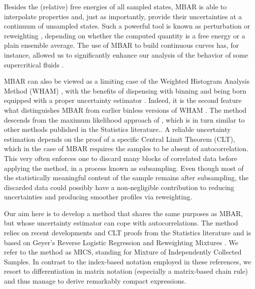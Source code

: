 \documentclass[journal=jctcce,manuscript=article,layout=twocolumn]{achemso}
\begin{document}
Besides the (relative) free energies of all sampled states, MBAR is able to interpolate properties and, just as importantly, provide their uncertainties at a continuum of unsampled states. Such a powerful tool is known as perturbation \cite{Zwanzig_1954} or reweighting \cite{McDonald_1967, McDonald_1969}, depending on whether the computed quantity is a free energy or a plain ensemble average. The use of MBAR to build continuous curves has, for instance, allowed us to significantly enhance our analysis of the behavior of some supercritical fluids \cite{Aimoli_2014, Aimoli_2014_2, Nichele_2018}.

MBAR can also be viewed as a limiting case of the Weighted Histogram Analysis Method (WHAM) \cite{Kumar_1992}, with the benefits of dispensing with binning \cite{Tan_2012} and being born equipped with a proper uncertainty estimator \cite{Shirts_2008}. Indeed, it is the second feature what distinguishes MBAR from earlier binless versions of WHAM \cite{Bartels_2000, Souaille_2001}. The method descends from the maximum likelihood approach of \citeauthor{Kong_2003} \cite{Kong_2003}, which is in turn similar to other methods published in the Statistics literature.\cite{Vardi_1985, Gill_1988, Geyer_1994, Lindsay_1995, Meng_1996}. A reliable uncertainty estimation depends on the proof of a specific Central Limit Theorem (CLT), which in the case of MBAR requires the samples to be absent of autocorrelation. This very often enforces one to discard many blocks of correlated data before applying the method, in a process known as subsampling. Even though most of the statistically meaningful content of the sample remains after subsampling, the discarded data could possibly have a non-negligible contribution to reducing uncertainties and producing smoother profiles via reweighting.

Our aim here is to develop a method that shares the same purposes as MBAR, but whose uncertainty estimator can cope with autocorrelations. The method relies on recent developments and CLT proofs from the Statistics literature\cite{Flegal_2010, Buta_2010, Buta_2011, Doss_2014, Vats_2015, Tan_2015, Roy_2018} and is based on Geyer's Reverse Logistic Regression and Reweighting Mixtures \cite{Geyer_1994}. We refer to the method as MICS, standing for Mixture of Independently Collected Samples. In contrast to the index-based notation employed in these references, we resort to differentiation in matrix notation (especially a matrix-based chain rule) and thus manage to derive remarkably compact expressions.
\end{document}
